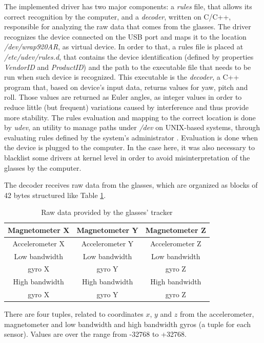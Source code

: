 \documentclass[msc, a4paper, classic, en]{ufbathesis}
\begin{document}
The implemented driver has two major components: a \textit{rules} file, that allows its correct recognition by the computer, and a \textit{decoder}, written on C/C++, responsible for analyzing the raw data that comes from the glasses. The driver recognizes the device connected on the USB port and maps it to the location \textit{/dev/wrap920AR}, as virtual device. In order to that, a rules file is placed at \textit{/etc/udev/rules.d}, that contains the device identification (defined by properties \textit{VendorID} and \textit{ProductID}) and the path to the executable file that needs to be run when such device is recognized. This executable is the \textit{decoder}, a C++ program that, based on device's input data, returns values for yaw, pitch and roll. Those values are returned as Euler angles, as integer values in order to reduce little (but frequent) variations caused by interference and thus provide more stability. The rules evaluation and mapping to the correct location is done by \textit{udev}, an utility to manage paths under \textit{/dev} on UNIX-based systems, through evaluating rules defined by the system's administrator \cite{udev}. Evaluation is done when the device is plugged to the computer. In the case here, it was also necessary to blacklist some drivers at kernel level in order to avoid misinterpretation of the glasses by the computer.

The decoder receives raw data from the glasses, which are organized as blocks of 42 bytes structured like Table \ref{tab:glassesdata}.

\begin{table}
\caption{Raw data provided by the glasses' tracker}
\label{tab:glassesdata}
\centering
\begin{tabular}{|c|c|c|}
\hline
Magnetometer X                & Magnetometer Y                & Magnetometer Z\\
\hline
Accelerometer X                & Accelerometer Y                & Accelerometer Z\\
\hline
Low bandwidth & Low bandwidth & Low bandwidth \\
gyro X & gyro Y & gyro Z \\
\hline
High bandwidth & High bandwidth & High bandwidth \\
gyro X & gyro Y & gyro Z \\
\hline
\end{tabular}
\end{table}

There are four tuples, related to coordinates $x$, $y$ and $z$ from the accelerometer, magnetometer and low bandwidth and high bandwidth gyros (a tuple for each sensor). Values are over the range from -32768 to +32768.
\end{document}

